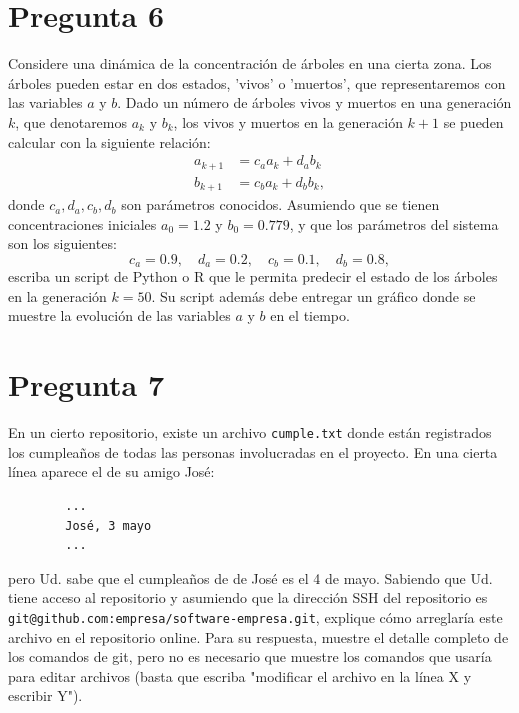 \documentclass{article}
\begin{document}
\section*{Pregunta 6}
Considere una dinámica de la concentración de árboles en una cierta zona. Los árboles pueden estar en dos estados, 'vivos' o 'muertos', que representaremos con las variables $a$ y $b$. Dado un número de árboles vivos y muertos en una generación $k$, que denotaremos $a_k$ y $b_k$, los vivos y muertos en la generación $k+1$ se pueden calcular con la siguiente relación:
    $$ 
    \begin{aligned}
        a_{k+1} &= c_a a_k + d_a b_k \\
        b_{k+1} &= c_b a_k + d_b b_k, 
    \end{aligned} 
    $$
donde $c_a,d_a,c_b,d_b$ son parámetros conocidos. Asumiendo que se tienen concentraciones iniciales $a_0=1.2$ y $b_0=0.779$, y que los parámetros del sistema son los siguientes:
    $$ c_a = 0.9, \quad d_a = 0.2, \quad c_b = 0.1, \quad d_b = 0.8, $$
escriba un script de Python o R que le permita predecir el estado de los árboles en la generación $k=50$. Su script además debe entregar un gráfico donde se muestre la evolución de las variables $a$ y $b$ en el tiempo. 
\section*{Pregunta 7}
En un cierto repositorio, existe un archivo \texttt{cumple.txt} donde están registrados los cumpleaños de todas las personas involucradas en el proyecto. En una cierta línea aparece el de su amigo José:

    \begin{verbatim}
        ... 
        José, 3 mayo
        ...
    \end{verbatim}
pero Ud. sabe que el cumpleaños de de José es el 4 de mayo. Sabiendo que Ud. tiene acceso al repositorio y asumiendo que la dirección SSH del repositorio es \texttt{git@github.com:empresa/software-empresa.git}, explique cómo arreglaría este archivo en el repositorio online. Para su respuesta, muestre el detalle completo de los comandos de git, pero no es necesario que muestre los comandos que usaría para editar archivos (basta que escriba "modificar el archivo en la línea X y escribir Y"). 
\end{document}
